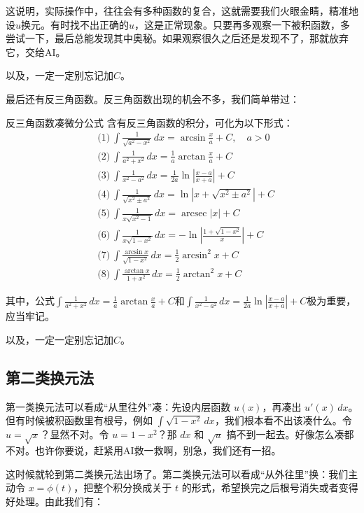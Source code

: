 这说明，实际操作中，往往会有多种函数的复合，这就需要我们火眼金睛，精准地设$u$换元。有时找不出正确的$u$，这是正常现象。只要再多观察一下被积函数，多尝试一下，最后总能发现其中奥秘。如果观察很久之后还是发现不了，那就放弃它，交给AI。

以及，一定一定别忘记加$C$。

最后还有反三角函数。反三角函数出现的机会不多，我们简单带过：


\begin{theorem}{反三角函数凑微分公式}{}
  含有反三角函数的积分，可化为以下形式：
  \[
\begin{aligned}
&\text{(1)}\ \int \frac{1}{\sqrt{a^2-x^2}} \,dx = \arcsin\frac{x}{a}+C, \quad a>0 \\[4pt]
&\text{(2)}\ \int \frac{1}{a^2+x^2} \,dx = \frac{1}{a}\arctan\frac{x}{a}+C \\[4pt]
&\text{(3)}\ \int \frac{1}{x^2-a^2} \,dx = \frac{1}{2a}\ln|\frac{x-a}{x+a}|+C \\[4pt]
&\text{(4)}\ \int \frac{1}{\sqrt{x^2\pm a^2}} \,dx = \ln|x+\sqrt{x^2\pm a^2}|+C \\[4pt]
&\text{(5)}\ \int \frac{1}{x\sqrt{x^2-1}} \,dx = \operatorname{arcsec}|x|+C \\[4pt]
&\text{(6)}\ \int \frac{1}{x\sqrt{1-x^2}} \,dx = -\ln|\frac{1+\sqrt{1-x^2}}{x}|+C \\[4pt]
&\text{(7)}\ \int \frac{\arcsin x}{\sqrt{1-x^2}} \,dx = \frac{1}{2}\arcsin^2 x + C \\[4pt]
&\text{(8)}\ \int \frac{\arctan x}{1+x^2} \,dx = \frac{1}{2}\arctan^2 x + C
\end{aligned}
\]
\end{theorem}

其中，公式$\int \frac{1}{a^2+x^2} \,dx = \frac{1}{a}\arctan\frac{x}{a}+C$和$\int \frac{1}{x^2-a^2} \,dx = \frac{1}{2a}\ln|\frac{x-a}{x+a}|+C$极为重要，应当牢记。

以及，一定一定别忘记加$C$。

\subsection{第二类换元法}

第一类换元法可以看成“从里往外”凑：先设内层函数 $u(x)$，再凑出 $u'(x)\,dx$。但有时候被积函数里有根号，例如 $\int \sqrt{1-x^2}\,dx$，我们根本看不出该凑什么。令 $u = \sqrt{x}$？显然不对。令 $u = 1-x^2$？那 $dx$ 和 $\sqrt{u}$ 搞不到一起去。好像怎么凑都不对。也许你要说，赶紧用AI救一救啊，别急，我们还有一招。

这时候就轮到第二类换元法出场了。第二类换元法可以看成“从外往里”换：我们主动令 $x = \phi(t)$，把整个积分换成关于 $t$ 的形式，希望换完之后根号消失或者变得好处理。由此我们有：

